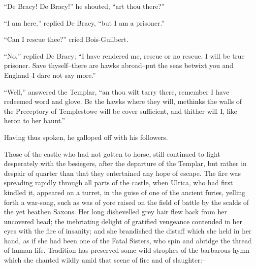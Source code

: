 ``De Bracy! De Bracy!'' he shouted, ``art thou there?''

``I am here,'' replied De Bracy, ``but I am a prisoner.''

``Can I rescue thee?'' cried Bois-Guilbert.

``No,'' replied De Bracy; ``I have rendered me, rescue or no rescue. I
will be true prisoner. Save thyself--there are hawks abroad--put the
seas betwixt you and England--I dare not say more.''

``Well,'' answered the Templar, ``an thou wilt tarry there, remember I
have redeemed word and glove. Be the hawks where they will, methinks the
walls of the Preceptory of Templestowe will be cover sufficient, and
thither will I, like heron to her haunt.''

Having thus spoken, he galloped off with his followers.

Those of the castle who had not gotten to horse, still continued to
fight desperately with the besiegers, after the departure of the
Templar, but rather in despair of quarter than that they entertained any
hope of escape. The fire was spreading rapidly through all parts of the
castle, when Ulrica, who had first kindled it, appeared on a turret, in
the guise of one of the ancient furies, yelling forth a war-song, such
as was of yore raised on the field of battle by the scalds of the yet
heathen Saxons. Her long dishevelled grey hair flew back from her
uncovered head; the inebriating delight of gratified vengeance contended
in her eyes with the fire of insanity; and she brandished the distaff
which she held in her hand, as if she had been one of the Fatal Sisters,
who spin and abridge the thread of human life. Tradition has preserved
some wild strophes of the barbarous hymn which she chanted wildly amid
that scene of fire and of slaughter:--

